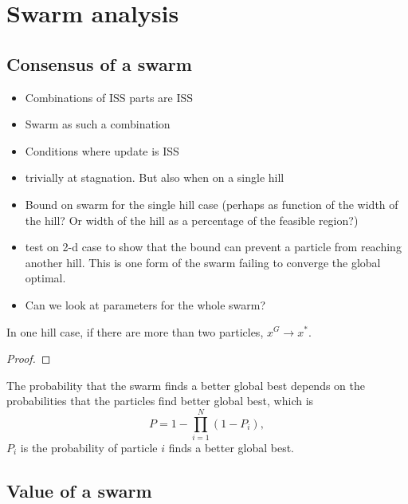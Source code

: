 \section{Swarm analysis}
\label{sec:swarm}

\subsection{Consensus of a swarm}

\begin{itemize}
\item Combinations of ISS parts are ISS
\item Swarm as such a combination
\item Conditions where update is ISS
\item trivially at stagnation. But also when on a single hill
\end{itemize}

\begin{itemize}
\item Bound on swarm for the single hill case (perhaps as function of the width of the hill?
Or width of the hill as a percentage of the feasible region?)
\item test on 2-d case to show that the bound can prevent a particle from reaching another hill.
This is one form of the swarm failing to converge the global optimal.
\item Can we look at parameters for the whole swarm?
\end{itemize}

\begin{mythm}
In one hill case, if there are more than two particles, $ x^{G} \rightarrow x^{*} $.
\begin{proof}
\end{proof}
\end{mythm}

\begin{mythm}
The probability that the swarm finds a better global best depends on the probabilities that the particles find better global best, which is
\begin{equation}
P = 1 - \prod_{i=1}^{N} ( 1 - P_{i} ),
\end{equation}
$ P_{i} $ is the probability of particle $ i $ finds a better global best.
\end{mythm}

\subsection{Value of a swarm}

